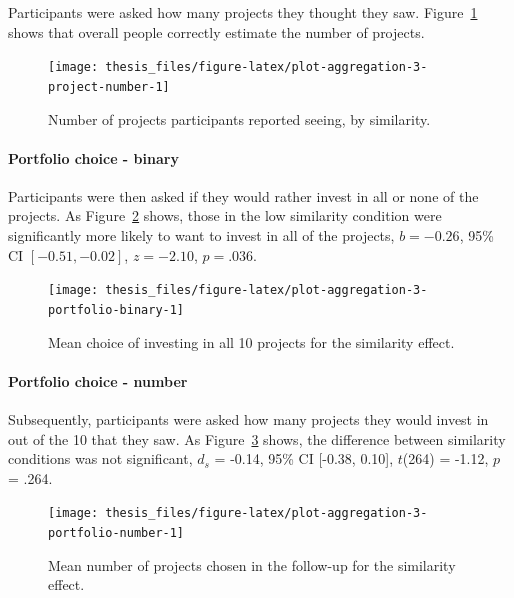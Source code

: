 \documentclass[a4paper, nobind, dvipsnames]{templates/ociamthesis}
\theoremstyle{definition}
\theoremstyle{definition}
\theoremstyle{definition}
\theoremstyle{definition}
\theoremstyle{remark}
\begin{document}
Participants were asked how many projects they thought they saw.
Figure~\ref{fig:plot-aggregation-3-project-number} shows that overall people
correctly estimate the number of projects.



\begin{figure}
\texttt{[image: thesis\_files/figure-latex/plot-aggregation-3-project-number-1]} \caption{Number of projects participants reported seeing, by similarity.}\label{fig:plot-aggregation-3-project-number}
\end{figure}

\paragraph{Portfolio choice - binary}

Participants were then asked if they would rather invest in all or none of the
projects. As Figure~\ref{fig:plot-aggregation-3-portfolio-binary} shows, those
in the low similarity condition were significantly more likely to want to invest
in all of the projects,
\(b = -0.26\), 95\% CI \([-0.51, -0.02]\), \(z = -2.10\), \(p = .036\).



\begin{figure}
\texttt{[image: thesis\_files/figure-latex/plot-aggregation-3-portfolio-binary-1]} \caption{Mean choice of investing in all 10 projects for the similarity effect.}\label{fig:plot-aggregation-3-portfolio-binary}
\end{figure}

\paragraph{Portfolio choice - number}

Subsequently, participants were asked how many projects they would invest in out
of the 10 that they saw. As
Figure~\ref{fig:plot-aggregation-3-portfolio-number} shows, the difference
between similarity conditions was not significant,
\(d_s\) = -0.14, 95\% CI {[}-0.38, 0.10{]}, \(t\)(264) = -1.12, \(p\) = .264.



\begin{figure}
\texttt{[image: thesis\_files/figure-latex/plot-aggregation-3-portfolio-number-1]} \caption{Mean number of projects chosen in the follow-up for the similarity effect.}\label{fig:plot-aggregation-3-portfolio-number}
\end{figure}
\end{document}
